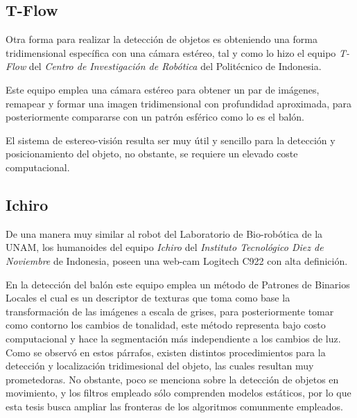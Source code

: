 	 \subsection*{T-Flow}
	 Otra forma para realizar la detección de objetos es obteniendo una forma tridimensional específica con una cámara estéreo, tal y como lo hizo el equipo \textit{T-Flow} del \textit{Centro de Investigación de Robótica} del Politécnico de Indonesia. 
	 

	 Este equipo emplea una cámara estéreo para obtener un par de imágenes, remapear y formar una imagen tridimensional con profundidad aproximada, para posteriormente compararse con un patrón esférico como lo es el balón. 	 


	 El sistema de estereo-visión resulta ser muy útil y sencillo para la detección y posicionamiento del objeto, no obstante, se requiere un elevado coste computacional.
	 
	\subsection*{Ichiro}
	De una manera muy similar al robot del Laboratorio de Bio-robótica de la UNAM, los humanoides del equipo \textit{Ichiro} del \textit{Instituto Tecnológico Diez de Noviembre} de Indonesia, poseen una web-cam Logitech C922 con alta definición.
	
	En la detección del balón este equipo emplea un método de Patrones de Binarios Locales el cual es un descriptor de texturas que toma como base la transformación de las imágenes a escala de grises, para posteriormente tomar como contorno los cambios de tonalidad, este método representa bajo costo computacional y hace la segmentación más independiente a los cambios de luz. 
\\

	Como se observó en estos párrafos, existen distintos procedimientos para la detección y localización tridimesional del objeto, las cuales resultan muy prometedoras. No obstante, poco se menciona sobre la detección de objetos en movimiento, y los filtros empleado sólo comprenden modelos estáticos, por lo que esta tesis busca ampliar las fronteras de los algoritmos comunmente empleados. 	 